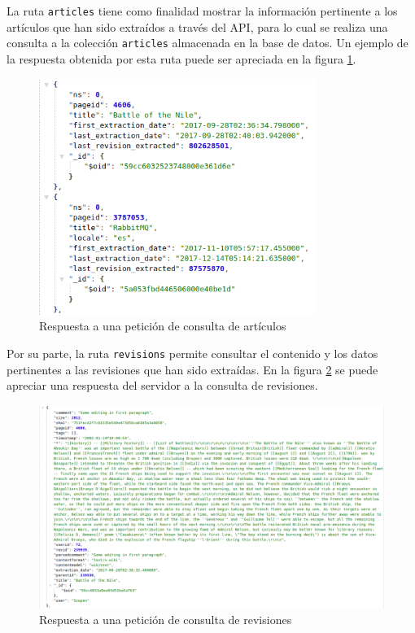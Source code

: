La ruta \texttt{articles} tiene como finalidad mostrar la información pertinente a los artículos que han sido extraídos a través del API, para lo cual se realiza una consulta a la colección \texttt{articles} almacenada en la base de datos. Un ejemplo de la respuesta obtenida por esta ruta puede ser apreciada en la figura \ref{fig:response_articles}.

\begin{figure}[H]
	\centering
		\includegraphics[width=0.8\textwidth]{figures/response_articles}
	\caption{Respuesta a una petición de consulta de artículos}
	\label{fig:response_articles}
\end{figure}

Por su parte, la ruta \texttt{revisions} permite consultar el contenido y los datos pertinentes a las revisiones que han sido extraídas.
En la figura \ref{fig:response_revisions} se puede apreciar una respuesta del servidor a la consulta de revisiones.

\begin{figure}[H]
	\centering
		\includegraphics[width=1\textwidth]{figures/response_revisions}
	\caption{Respuesta a una petición de consulta de revisiones}
	\label{fig:response_revisions}
\end{figure}

